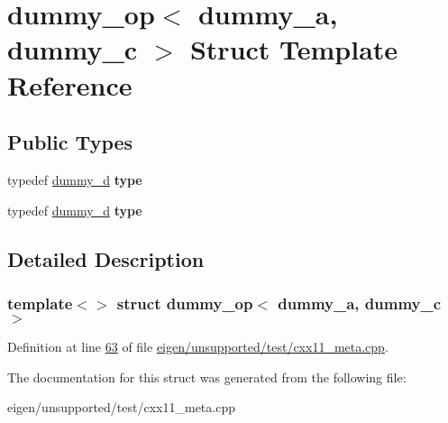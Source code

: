 \hypertarget{structdummy__op_3_01dummy__a_00_01dummy__c_01_4}{}\section{dummy\+\_\+op$<$ dummy\+\_\+a, dummy\+\_\+c $>$ Struct Template Reference}
\label{structdummy__op_3_01dummy__a_00_01dummy__c_01_4}
\subsection*{Public Types}
\begin{DoxyCompactItemize}
\item 
\mbox{\label{structdummy__op_3_01dummy__a_00_01dummy__c_01_4_a74ffa5c9ab7aaea2888814066d0171d0}} 
typedef \hyperlink{structdummy__d}{dummy\+\_\+d} {\bfseries type}
\item 
\mbox{\label{structdummy__op_3_01dummy__a_00_01dummy__c_01_4_a74ffa5c9ab7aaea2888814066d0171d0}} 
typedef \hyperlink{structdummy__d}{dummy\+\_\+d} {\bfseries type}
\end{DoxyCompactItemize}


\subsection{Detailed Description}
\subsubsection*{template$<$$>$\newline
struct dummy\+\_\+op$<$ dummy\+\_\+a, dummy\+\_\+c $>$}



Definition at line \hyperlink{eigen_2unsupported_2test_2cxx11__meta_8cpp_source_l00063}{63} of file \hyperlink{eigen_2unsupported_2test_2cxx11__meta_8cpp_source}{eigen/unsupported/test/cxx11\+\_\+meta.\+cpp}.



The documentation for this struct was generated from the following file\+:\begin{DoxyCompactItemize}
\item 
eigen/unsupported/test/cxx11\+\_\+meta.\+cpp\end{DoxyCompactItemize}
